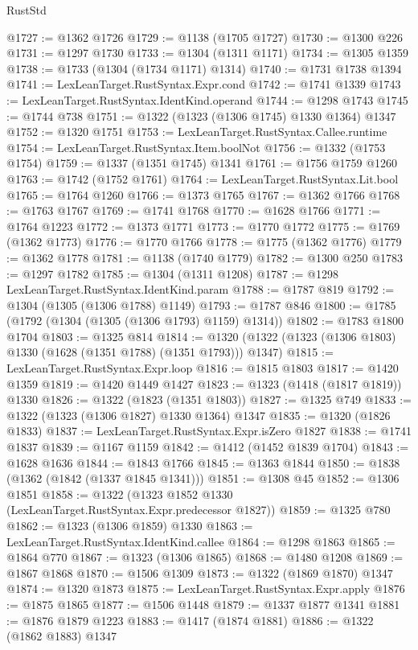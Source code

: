\begin{lexlean}{RustStd}
\begin{coremodule}
@1727 := @1362 @1726
@1729 := @1138 (@1705 @1727)
@1730 := @1300 @226
@1731 := @1297 @1730
@1733 := @1304 (@1311 @1171)
@1734 := @1305 @1359
@1738 := @1733 (@1304 (@1734 @1171) @1314)
@1740 := @1731 @1738 @1394
@1741 := LexLeanTarget.RustSyntax.Expr.cond
@1742 := @1741 @1339
@1743 := LexLeanTarget.RustSyntax.IdentKind.operand
@1744 := @1298 @1743
@1745 := @1744 @738
@1751 := @1322 (@1323 (@1306 @1745) @1330 @1364) @1347
@1752 := @1320 @1751
@1753 := LexLeanTarget.RustSyntax.Callee.runtime
@1754 := LexLeanTarget.RustSyntax.Item.boolNot
@1756 := @1332 (@1753 @1754)
@1759 := @1337 (@1351 @1745) @1341
@1761 := @1756 @1759 @1260
@1763 := @1742 (@1752 @1761)
@1764 := LexLeanTarget.RustSyntax.Lit.bool
@1765 := @1764 @1260
@1766 := @1373 @1765
@1767 := @1362 @1766
@1768 := @1763 @1767
@1769 := @1741 @1768
@1770 := @1628 @1766
@1771 := @1764 @1223
@1772 := @1373 @1771
@1773 := @1770 @1772
@1775 := @1769 (@1362 @1773)
@1776 := @1770 @1766
@1778 := @1775 (@1362 @1776)
@1779 := @1362 @1778
@1781 := @1138 (@1740 @1779)
@1782 := @1300 @250
@1783 := @1297 @1782
@1785 := @1304 (@1311 @1208)
@1787 := @1298 LexLeanTarget.RustSyntax.IdentKind.param
@1788 := @1787 @819
@1792 := @1304 (@1305 (@1306 @1788) @1149)
@1793 := @1787 @846
@1800 := @1785 (@1792 (@1304 (@1305 (@1306 @1793) @1159) @1314))
@1802 := @1783 @1800 @1704
@1803 := @1325 @814
@1814 := @1320 (@1322 (@1323 (@1306 @1803) @1330 (@1628 (@1351 @1788) (@1351 @1793))) @1347)
@1815 := LexLeanTarget.RustSyntax.Expr.loop
@1816 := @1815 @1803
@1817 := @1420 @1359
@1819 := @1420 @1449 @1427
@1823 := @1323 (@1418 (@1817 @1819)) @1330
@1826 := @1322 (@1823 (@1351 @1803))
@1827 := @1325 @749
@1833 := @1322 (@1323 (@1306 @1827) @1330 @1364) @1347
@1835 := @1320 (@1826 @1833)
@1837 := LexLeanTarget.RustSyntax.Expr.isZero @1827
@1838 := @1741 @1837
@1839 := @1167 @1159
@1842 := @1412 (@1452 @1839 @1704)
@1843 := @1628 @1636
@1844 := @1843 @1766
@1845 := @1363 @1844
@1850 := @1838 (@1362 (@1842 (@1337 @1845 @1341)))
@1851 := @1308 @45
@1852 := @1306 @1851
@1858 := @1322 (@1323 @1852 @1330 (LexLeanTarget.RustSyntax.Expr.predecessor @1827))
@1859 := @1325 @780
@1862 := @1323 (@1306 @1859) @1330
@1863 := LexLeanTarget.RustSyntax.IdentKind.callee
@1864 := @1298 @1863
@1865 := @1864 @770
@1867 := @1323 (@1306 @1865)
@1868 := @1480 @1208
@1869 := @1867 @1868
@1870 := @1506 @1309
@1873 := @1322 (@1869 @1870) @1347
@1874 := @1320 @1873
@1875 := LexLeanTarget.RustSyntax.Expr.apply
@1876 := @1875 @1865
@1877 := @1506 @1448
@1879 := @1337 @1877 @1341
@1881 := @1876 @1879 @1223
@1883 := @1417 (@1874 @1881)
@1886 := @1322 (@1862 @1883) @1347

\end{coremodule}
\end{lexlean}
